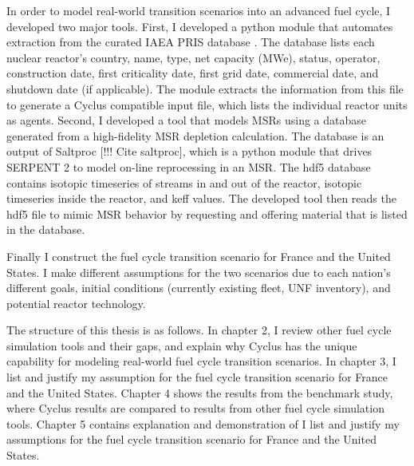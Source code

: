 In order to model real-world transition scenarios into an advanced
fuel cycle, I developed two major tools. First, I developed a python
module that automates extraction from the curated \gls{IAEA} \gls{PRIS} database
\cite{iaea_nuclear_2018}. The database lists each nuclear reactor's
country, name, type, net capacity (\gls{MWe}), status, operator, construction
date, first criticality date, first grid date, commercial date, and shutdown
date (if applicable). The module extracts the information from this file
to generate a Cyclus compatible input file, which lists the individual
reactor units as agents. Second, I developed a tool that models \glspl{MSR}
using a database generated from a high-fidelity \gls{MSR} depletion calculation.
The database is an output of Saltproc [!!! Cite saltproc], which is a python
module that drives
SERPENT 2 \cite{jaakko_serpent-a_2013} to model on-line reprocessing in an \gls{MSR}.
The hdf5 database contains isotopic timeseries of streams in and out of the reactor,
isotopic timeseries inside the reactor, and keff values. The developed tool then
reads the hdf5 file to mimic \gls{MSR} behavior by requesting and offering
material that is listed in the database.

Finally I construct the fuel cycle transition scenario for France and the United States.
I make different assumptions for the two scenarios due to each nation's different goals,
initial conditions (currently existing fleet, \gls{UNF} inventory), and potential reactor
technology.

The structure of this thesis is as follows. In chapter 2, I review other fuel cycle simulation
tools and their gaps, and explain why Cyclus
has the unique capability for modeling real-world fuel cycle transition scenarios.
In chapter 3, I list and justify my assumption for the fuel cycle transition
scenario for France and the United States.
Chapter 4 shows the results from the benchmark study, where Cyclus results are compared
to results from other fuel cycle simulation tools.
Chapter 5 contains explanation and demonstration of  
 I list and justify my assumptions
for the fuel cycle transition scenario for France and the United States. 

\iffalse
For France, I model the entire \gls{EU} region to calculate \gls{UNF} inventory
in each \gls{EU} nation. This is because France would need to receive \gls{UNF} from other
nations to quickly transition into a \gls{SFR} fleet, since their \gls{UNF} inventory
is small due to their long history of reprocessing for \gls{LWR} \gls{MOX} fuel production.
\fi

